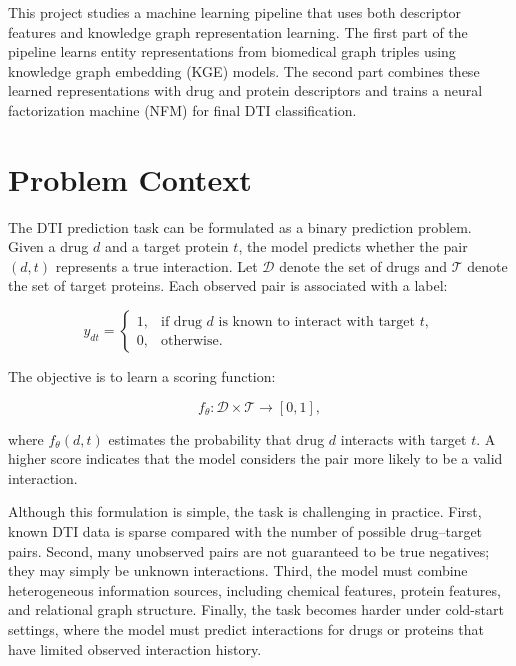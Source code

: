 This project studies a machine learning pipeline that uses both descriptor
features and knowledge graph representation learning. The first part of the
pipeline learns entity representations from biomedical graph triples using
knowledge graph embedding (KGE) models. The second part combines these learned
representations with drug and protein descriptors and trains a neural
factorization machine (NFM) for final DTI classification.

\section{Problem Context}

The DTI prediction task can be formulated as a binary prediction problem. Given
a drug $d$ and a target protein $t$, the model predicts whether the pair
$(d,t)$ represents a true interaction. Let $\mathcal{D}$ denote the set of
drugs and $\mathcal{T}$ denote the set of target proteins. Each observed pair is
associated with a label:

\begin{equation}
    y_{dt} =
    \begin{cases}
        1, & \text{if drug } d \text{ is known to interact with target } t, \\
        0, & \text{otherwise.}
    \end{cases}
\end{equation}

The objective is to learn a scoring function:

\begin{equation}
    f_{\theta}: \mathcal{D} \times \mathcal{T} \rightarrow [0,1],
\end{equation}

where $f_{\theta}(d,t)$ estimates the probability that drug $d$ interacts with
target $t$. A higher score indicates that the model considers the pair more
likely to be a valid interaction.

Although this formulation is simple, the task is challenging in practice. First,
known DTI data is sparse compared with the number of possible drug--target
pairs. Second, many unobserved pairs are not guaranteed to be true negatives;
they may simply be unknown interactions. Third, the model must combine
heterogeneous information sources, including chemical features, protein
features, and relational graph structure. Finally, the task becomes harder under
cold-start settings, where the model must predict interactions for drugs or
proteins that have limited observed interaction history.

